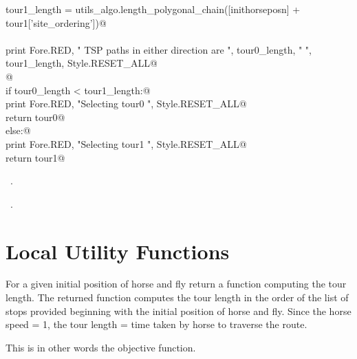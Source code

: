 \documentclass[11.5pt]{report}
\begin{document}
\begin{flushleft}
\begin{list}{}{}
\mbox{}\verb@    tour1_length = utils_algo.length_polygonal_chain([inithorseposn] + tour1['site_ordering'])@\\
\mbox{}\verb@@\\
\mbox{}\verb@    print Fore.RED, " TSP paths in either direction are ", tour0_length, " ", tour1_length, Style.RESET_ALL@\\
\mbox{}\verb@    @\\
\mbox{}\verb@    if tour0_length < tour1_length:@\\
\mbox{}\verb@        print Fore.RED, "Selecting tour0 ", Style.RESET_ALL@\\
\mbox{}\verb@        return tour0@\\
\mbox{}\verb@    else:@\\
\mbox{}\verb@        print Fore.RED, "Selecting tour1 ", Style.RESET_ALL@\\
\mbox{}\verb@        return tour1@\\
\mbox{}\verb@@{\NWsep}
\end{list}
\vspace{-1.5ex}
\footnotesize
\begin{list}{}{\setlength{\itemsep}{-\parsep}\setlength{\itemindent}{-\leftmargin}}
\item \NWtxtMacroDefBy\ .
\item \NWtxtMacroRefIn\ .

\item{}
\end{list}
\vspace{4ex}
\end{flushleft}


\needspace{17cm}
\section{Local Utility Functions}

\newchunk  For a given initial position of horse and fly
   return a function computing the tour length. 
   The returned function computes the tour length 
   in the order of the list of stops provided beginning 
   with the initial position of horse and fly. Since 
   the horse speed = 1, the tour length = time taken 
   by horse to traverse the route.

   This is in other words the objective function. 
\end{document}
